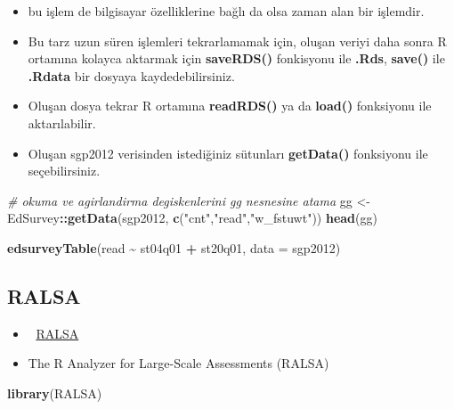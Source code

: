 \documentclass[
  oneside]{book}
\newenvironment{Shaded}{\begin{snugshade}}{\end{snugshade}}
\newcommand{\AttributeTok}[1]{\textcolor[rgb]{0.13,0.29,0.53}{#1}}
\newcommand{\CommentTok}[1]{\textcolor[rgb]{0.56,0.35,0.01}{\textit{#1}}}
\newcommand{\FunctionTok}[1]{\textcolor[rgb]{0.13,0.29,0.53}{\textbf{#1}}}
\newcommand{\NormalTok}[1]{#1}
\newcommand{\OtherTok}[1]{\textcolor[rgb]{0.56,0.35,0.01}{#1}}
\newcommand{\SpecialCharTok}[1]{\textcolor[rgb]{0.81,0.36,0.00}{\textbf{#1}}}
\newcommand{\StringTok}[1]{\textcolor[rgb]{0.31,0.60,0.02}{#1}}
\begin{document}
\begin{itemize}
\item
  bu işlem de bilgisayar özelliklerine bağlı da olsa zaman alan bir işlemdir.
\item
  Bu tarz uzun süren işlemleri tekrarlamamak için, oluşan veriyi daha sonra R ortamına kolayca aktarmak için \textbf{saveRDS()} fonkisyonu ile \textbf{.Rds}, \textbf{save()} ile \textbf{.Rdata} bir dosyaya kaydedebilirsiniz.
\item
  Oluşan dosya tekrar R ortamına \textbf{readRDS()} ya da \textbf{load()} fonksiyonu ile aktarılabilir.
\item
  Oluşan sgp2012 verisinden istediğiniz sütunları \textbf{getData()} fonksiyonu ile seçebilirsiniz.
\end{itemize}

\begin{Shaded}
\begin{Highlighting}[]
\CommentTok{\# okuma ve agirlandirma degiskenlerini gg nesnesine atama}
\NormalTok{gg }\OtherTok{\textless{}{-}}\NormalTok{ EdSurvey}\SpecialCharTok{::}\FunctionTok{getData}\NormalTok{(sgp2012, }\FunctionTok{c}\NormalTok{(}\StringTok{"cnt"}\NormalTok{,}\StringTok{"read"}\NormalTok{,}\StringTok{"w\_fstuwt"}\NormalTok{))  }
\FunctionTok{head}\NormalTok{(gg)}
\end{Highlighting}
\end{Shaded}

\begin{Shaded}
\begin{Highlighting}[]
\FunctionTok{edsurveyTable}\NormalTok{(read }\SpecialCharTok{\textasciitilde{}}\NormalTok{ st04q01 }\SpecialCharTok{+}\NormalTok{ st20q01, }\AttributeTok{data =}\NormalTok{ sgp2012)}
\end{Highlighting}
\end{Shaded}

\hypertarget{ralsa}{%
\subsection{RALSA}\label{ralsa}}

\begin{itemize}
\item
  🔗 \href{http://ralsa.ineri.org/user-guide/}{RALSA}
\item
  The R Analyzer for Large-Scale Assessments (RALSA)
\end{itemize}

\begin{Shaded}
\begin{Highlighting}[]
\FunctionTok{library}\NormalTok{(RALSA)}
\end{Highlighting}
\end{Shaded}
\end{document}
